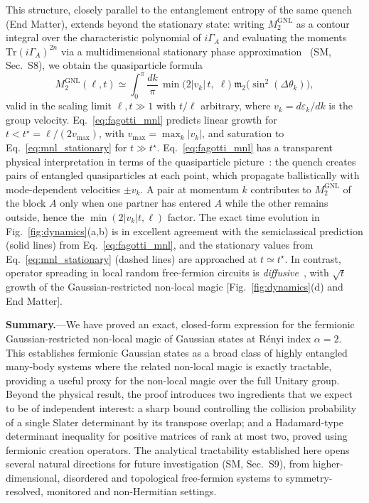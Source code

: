 \documentclass[aps,prl,twocolumn,superscriptaddress,reprint,longbibliography,nofootinbib]{revtex4-2}
\newcommand{\RENYI}{\alpha}
\begin{document}
This structure, closely parallel to the entanglement entropy of the same quench (End Matter), extends beyond the stationary state: writing $M_2^{\mathrm{GNL}}$ as a contour integral over the characteristic polynomial of $i\Gamma_A$ and evaluating the moments $\mathrm{Tr}(i\Gamma_A)^{2n}$ via a multidimensional stationary phase approximation~\cite{Fagotti2008} (SM, Sec.~S8), we obtain the quasiparticle formula
\begin{equation}
    M_2^{\mathrm{GNL}}(\ell,t) \simeq \int_0^\pi\!\frac{dk}{\pi}\,\min\!\bigl(2|v_k|\,t,\;\ell\bigr)\;\mathfrak{m}_2\!\bigl(\sin^2(\Delta\theta_k)\bigr),
    \label{eq:fagotti_mnl}
\end{equation}
valid in the scaling limit $\ell, t \gg 1$ with $t/\ell$ arbitrary, where $v_k = d\varepsilon_k/dk$ is the group velocity.
Eq.~\eqref{eq:fagotti_mnl} predicts linear growth for $t < t^\star = \ell/(2v_{\max})$, with $v_{\max}=\max_k|v_k|$, and saturation to Eq.~\eqref{eq:mnl_stationary} for $t \gg t^\star$.
Eq.~\eqref{eq:fagotti_mnl} has a transparent physical interpretation in terms of the quasiparticle picture~\cite{Calabrese2005evolution,Fagotti2008}: the quench creates pairs of entangled quasiparticles at each point, which propagate ballistically with mode-dependent velocities $\pm v_k$.
A pair at momentum $k$ contributes to $M_2^{\mathrm{GNL}}$ of the block $A$ only when one partner has entered $A$ while the other remains outside, hence the $\min(2|v_k|t,\ell)$ factor.
The exact time evolution in Fig.~\ref{fig:dynamics}(a,b) is in excellent agreement with the semiclassical prediction (solid lines) from Eq.~\eqref{eq:fagotti_mnl}, and the stationary values from Eq.~\eqref{eq:mnl_stationary} (dashed lines) are approached at $t \simeq t^\star$.
In contrast, operator spreading in local random free-fermion circuits is \emph{diffusive}~\cite{dias2021diffusiveoperatorspreadingrandom,swann}, with $\sqrt{t}$ growth of the Gaussian-restricted non-local magic [Fig.~\ref{fig:dynamics}(d) and End Matter].

\textbf{Summary.}---We have proved an exact, closed-form expression for the fermionic Gaussian-restricted non-local magic of Gaussian states at R\'enyi index $\RENYI=2$.
This establishes fermionic Gaussian states as a broad class of highly entangled many-body systems where the related non-local magic is exactly tractable, providing a useful proxy for the non-local magic over the full Unitary group.
Beyond the physical result, the proof introduces two ingredients that we expect to be of independent interest: a sharp bound controlling the collision probability of a single Slater determinant by its transpose overlap; and a Hadamard-type determinant inequality for positive matrices of rank at most two, proved using fermionic creation operators.
The analytical tractability established here opens several natural directions for future investigation (SM, Sec.~S9), from higher-dimensional, disordered and topological free-fermion systems to symmetry-resolved, monitored and non-Hermitian settings.
\end{document}
